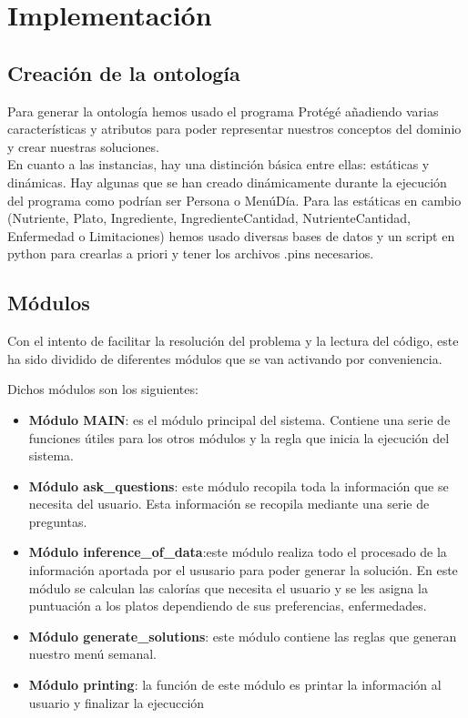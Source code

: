 \documentclass[12]{article}
\begin{document}
\section{Implementación}

\subsection{Creación de la ontología}
Para generar la ontología hemos usado el programa Protégé añadiendo varias características y atributos para poder representar nuestros conceptos del dominio y crear nuestras soluciones.
\\
En cuanto a las instancias, hay una distinción básica entre ellas: estáticas y dinámicas. Hay algunas que se han creado dinámicamente durante la ejecución del programa como podrían ser Persona o MenúDía. Para las estáticas en cambio (Nutriente, Plato, Ingrediente, IngredienteCantidad, NutrienteCantidad, Enfermedad o Limitaciones) hemos usado diversas bases de datos y un script en python para crearlas a priori y tener los archivos .pins necesarios. 
\subsection{Módulos}
Con el intento de facilitar la resolución del problema y la lectura del código, este ha sido dividido de diferentes módulos que se van activando por conveniencia.
\par
Dichos módulos son los siguientes:
\begin{itemize}
	\item \textbf{Módulo MAIN}: es el módulo principal del sistema. Contiene una serie de funciones útiles para los otros módulos y la regla que inicia la ejecución del sistema. 
	\item \textbf{Módulo ask\_questions}: este módulo recopila toda la información que se necesita del usuario. Esta información se recopila mediante una serie de preguntas. 
	\item \textbf{Módulo inference\_of\_data}:este módulo realiza todo el procesado de la información aportada por el ususario para poder generar la solución. En este módulo se calculan las calorías que necesita el usuario y se les asigna la puntuación a los platos dependiendo de sus preferencias, enfermedades.  
	\item \textbf{Módulo generate\_solutions}: este módulo contiene las reglas que generan nuestro menú semanal.
	\item \textbf{Módulo printing}: la función de este módulo es printar la información al usuario y finalizar la ejecucción
\end{itemize}
\end{document}

